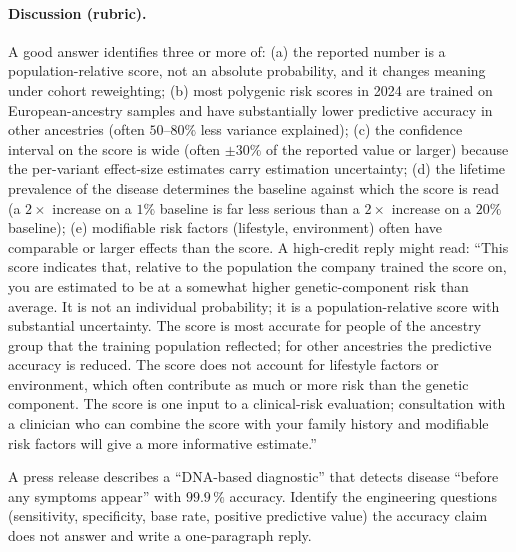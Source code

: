 \paragraph{Discussion (rubric).} A good answer identifies three or
more of: (a) the reported number is a population-relative score, not
an absolute probability, and it changes meaning under cohort
reweighting; (b) most polygenic risk scores in 2024 are trained on
European-ancestry samples and have substantially lower predictive
accuracy in other ancestries (often $50$--$80\%$ less variance
explained); (c) the confidence interval on the score is wide (often
$\pm 30\%$ of the reported value or larger) because the per-variant
effect-size estimates carry estimation uncertainty; (d) the lifetime
prevalence of the disease determines the baseline against which the
score is read (a $2 \times$ increase on a $1\%$ baseline is far less
serious than a $2 \times$ increase on a $20\%$ baseline); (e) modifiable
risk factors (lifestyle, environment) often have comparable or larger
effects than the score. A high-credit reply might read:
``This score indicates that, relative to the population the company
trained the score on, you are estimated to be at a somewhat higher
genetic-component risk than average. It is not an individual
probability; it is a population-relative score with substantial
uncertainty. The score is most accurate for people of the ancestry
group that the training population reflected; for other ancestries
the predictive accuracy is reduced. The score does not account for
lifestyle factors or environment, which often contribute as much
or more risk than the genetic component. The score is one input to
a clinical-risk evaluation; consultation with a clinician who can
combine the score with your family history and modifiable risk
factors will give a more informative estimate.''

\begin{exercise}
A press release describes a ``DNA-based diagnostic'' that detects
disease ``before any symptoms appear'' with $99.9\,\%$ accuracy.
Identify the engineering questions (sensitivity, specificity, base
rate, positive predictive value) the accuracy claim does not answer
and write a one-paragraph reply.
\end{exercise}

